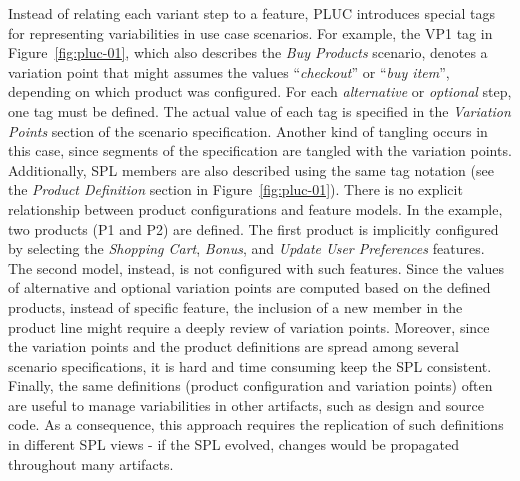 \documentclass{llncs}
\begin{document}
Instead of relating each variant step to a feature, PLUC introduces special tags for representing 
variabilities in use case scenarios. For example, the VP1 tag in Figure~\ref{fig:pluc-01}, which also 
describes the \emph{Buy Products} scenario, denotes a variation point that might assumes the 
values ``\emph{checkout}'' or ``\emph{buy item}'', depending on which product was configured. For 
each \emph{alternative} or \emph{optional} step, one tag must be defined. The actual value
of each tag is specified in the \emph{Variation Points} section of the scenario specification. Another kind 
of tangling occurs in this case, since segments of the specification are tangled with the variation 
points. Additionally, SPL members are also described using the same tag notation (see the \emph{Product Definition} section 
in Figure~\ref{fig:pluc-01}). There is no explicit relationship between product configurations and feature models. In the example, 
two products (P1 and P2) are defined. The first product is implicitly configured by selecting the \emph{Shopping Cart}, 
\emph{Bonus}, and \emph{Update User Preferences} features. The second model, instead, is not configured 
with such features. Since the values of alternative and optional variation points are computed based on the defined products, instead 
of specific feature, the inclusion of a new member in the product line might require a deeply review of 
variation points. Moreover, since the variation points and the product definitions are spread among several scenario specifications, it is 
hard and time consuming keep the SPL consistent. Finally, the same definitions (product configuration and variation points) often are 
useful to manage variabilities in other artifacts, such as design and source code. As a consequence, this approach requires the replication of such 
definitions in different SPL views - if the SPL evolved, changes would be propagated throughout many artifacts.
\end{document}
